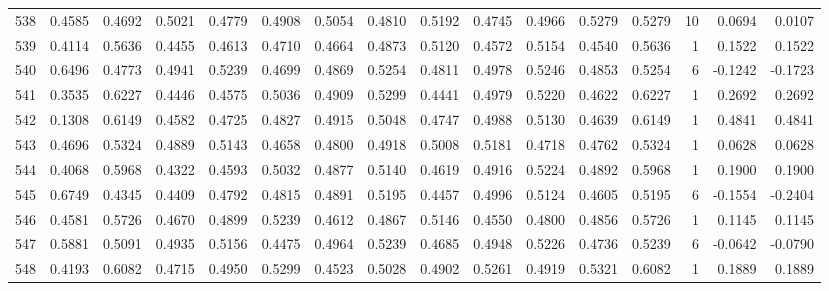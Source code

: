 \begin{tabular}{lrrrrrrrrrrrrrrr}
538 &      0.4585 &  0.4692 &  0.5021 &  0.4779 &  0.4908 &  0.5054 &  0.4810 &  0.5192 &  0.4745 &  0.4966 &   0.5279 &     0.5279 &     10 &                    0.0694 &                     0.0107 \\
539 &      0.4114 &  0.5636 &  0.4455 &  0.4613 &  0.4710 &  0.4664 &  0.4873 &  0.5120 &  0.4572 &  0.5154 &   0.4540 &     0.5636 &      1 &                    0.1522 &                     0.1522 \\
540 &      0.6496 &  0.4773 &  0.4941 &  0.5239 &  0.4699 &  0.4869 &  0.5254 &  0.4811 &  0.4978 &  0.5246 &   0.4853 &     0.5254 &      6 &                   -0.1242 &                    -0.1723 \\
541 &      0.3535 &  0.6227 &  0.4446 &  0.4575 &  0.5036 &  0.4909 &  0.5299 &  0.4441 &  0.4979 &  0.5220 &   0.4622 &     0.6227 &      1 &                    0.2692 &                     0.2692 \\
542 &      0.1308 &  0.6149 &  0.4582 &  0.4725 &  0.4827 &  0.4915 &  0.5048 &  0.4747 &  0.4988 &  0.5130 &   0.4639 &     0.6149 &      1 &                    0.4841 &                     0.4841 \\
543 &      0.4696 &  0.5324 &  0.4889 &  0.5143 &  0.4658 &  0.4800 &  0.4918 &  0.5008 &  0.5181 &  0.4718 &   0.4762 &     0.5324 &      1 &                    0.0628 &                     0.0628 \\
544 &      0.4068 &  0.5968 &  0.4322 &  0.4593 &  0.5032 &  0.4877 &  0.5140 &  0.4619 &  0.4916 &  0.5224 &   0.4892 &     0.5968 &      1 &                    0.1900 &                     0.1900 \\
545 &      0.6749 &  0.4345 &  0.4409 &  0.4792 &  0.4815 &  0.4891 &  0.5195 &  0.4457 &  0.4996 &  0.5124 &   0.4605 &     0.5195 &      6 &                   -0.1554 &                    -0.2404 \\
546 &      0.4581 &  0.5726 &  0.4670 &  0.4899 &  0.5239 &  0.4612 &  0.4867 &  0.5146 &  0.4550 &  0.4800 &   0.4856 &     0.5726 &      1 &                    0.1145 &                     0.1145 \\
547 &      0.5881 &  0.5091 &  0.4935 &  0.5156 &  0.4475 &  0.4964 &  0.5239 &  0.4685 &  0.4948 &  0.5226 &   0.4736 &     0.5239 &      6 &                   -0.0642 &                    -0.0790 \\
548 &      0.4193 &  0.6082 &  0.4715 &  0.4950 &  0.5299 &  0.4523 &  0.5028 &  0.4902 &  0.5261 &  0.4919 &   0.5321 &     0.6082 &      1 &                    0.1889 &                     0.1889 \\

\end{tabular}
